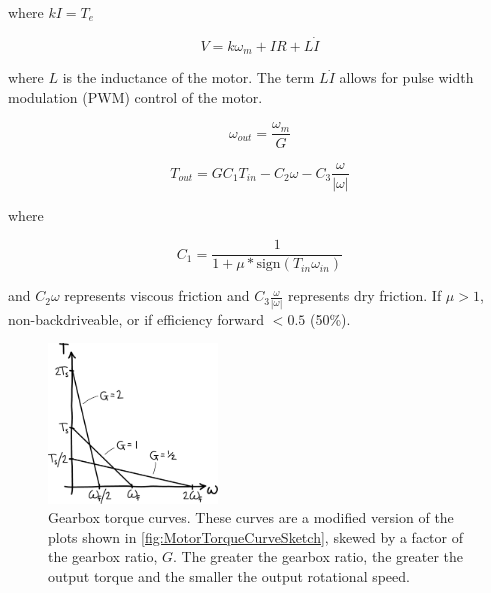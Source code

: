 where $kI=T_{e}$

\begin{equation}
V=k\omega_{m}+IR+L\dot{I}
\label{eq:CompleteMotorLaw2}
\end{equation}

where $L$ is the inductance of the motor. The term $L\dot{I}$ allows for pulse width modulation (PWM) control of the motor.

\begin{equation}
\omega_{out}=\frac{\omega_{m}}{G}
\label{eq:CompleteMotorLaw3}
\end{equation}

\begin{equation}
T_{out}=GC_{1}T_{in}-C_{2}\omega-C_{3}\frac{\omega}{|\omega|}
\label{eq:CompleteMotorLaw4}
\end{equation}

where

\begin{equation}
C_{1}=\frac{1}{1+\mu* \mbox{sign}\left(T_{in}\omega_{in}\right)}
\label{eq:CompleteMotorLaw5}
\end{equation}

and $C_{2}\omega$ represents viscous friction and $C_{3}\frac{\omega}{|\omega|}$ represents dry friction. If $\mu > 1$, non-backdriveable, or if efficiency forward $< 0.5$ (50\%).

\begin{figure}[htb]		%
\begin{centering}
\includegraphics[width=0.4\textwidth]{Figures/GearboxCurves}\par
\end{centering}
\caption[Plot: Gearbox Torque Curves]{Gearbox torque curves. These curves are a modified version of the plots shown in \ref{fig:MotorTorqueCurveSketch}, skewed by a factor of the gearbox ratio, $G$. The greater the gearbox ratio, the greater the output torque and the smaller the output rotational speed.}
\label{fig:GearboxCurves}
\end{figure}
%

